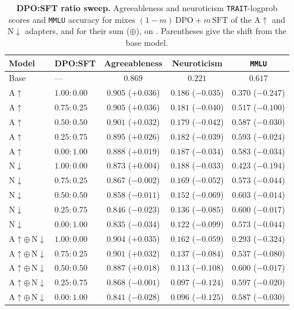 \begin{table}[H]
\centering
\caption{\textbf{DPO:SFT ratio sweep.} Agreeableness and neuroticism
\texttt{TRAIT}-logprob scores and \texttt{MMLU} accuracy for mixes
$(1-m)\,\text{DPO} + m\,\text{SFT}$ of the A$\uparrow$ and N$\downarrow$
adapters, and for their sum ($\oplus$), on
\LlamaThreePointOneSizeEightBInstruct. Parentheses give the shift from the
base model.}
\label{tab:soup-ratio-mix}
\small
\begin{tabular}{llccc}
\toprule
Model & DPO:SFT & Agreeableness & Neuroticism & \texttt{MMLU} \\
\midrule
Base & --- & $0.869$ & $0.221$ & $0.617$ \\
\midrule
A$\uparrow$ & $1.00:0.00$ & $0.905$ ($+0.036$) & $0.186$ ($-0.035$) & $0.370$ ($-0.247$) \\
A$\uparrow$ & $0.75:0.25$ & $0.905$ ($+0.036$) & $0.181$ ($-0.040$) & $0.517$ ($-0.100$) \\
A$\uparrow$ & $0.50:0.50$ & $0.901$ ($+0.032$) & $0.179$ ($-0.042$) & $0.587$ ($-0.030$) \\
A$\uparrow$ & $0.25:0.75$ & $0.895$ ($+0.026$) & $0.182$ ($-0.039$) & $0.593$ ($-0.024$) \\
A$\uparrow$ & $0.00:1.00$ & $0.888$ ($+0.019$) & $0.187$ ($-0.034$) & $0.583$ ($-0.034$) \\
\midrule
N$\downarrow$ & $1.00:0.00$ & $0.873$ ($+0.004$) & $0.188$ ($-0.033$) & $0.423$ ($-0.194$) \\
N$\downarrow$ & $0.75:0.25$ & $0.867$ ($-0.002$) & $0.169$ ($-0.052$) & $0.573$ ($-0.044$) \\
N$\downarrow$ & $0.50:0.50$ & $0.858$ ($-0.011$) & $0.152$ ($-0.069$) & $0.603$ ($-0.014$) \\
N$\downarrow$ & $0.25:0.75$ & $0.846$ ($-0.023$) & $0.136$ ($-0.085$) & $0.600$ ($-0.017$) \\
N$\downarrow$ & $0.00:1.00$ & $0.835$ ($-0.034$) & $0.122$ ($-0.099$) & $0.573$ ($-0.044$) \\
\midrule
A$\uparrow \oplus\,$N$\downarrow$ & $1.00:0.00$ & $0.904$ ($+0.035$) & $0.162$ ($-0.059$) & $0.293$ ($-0.324$) \\
A$\uparrow \oplus\,$N$\downarrow$ & $0.75:0.25$ & $0.901$ ($+0.032$) & $0.137$ ($-0.084$) & $0.537$ ($-0.080$) \\
A$\uparrow \oplus\,$N$\downarrow$ & $0.50:0.50$ & $0.887$ ($+0.018$) & $0.113$ ($-0.108$) & $0.600$ ($-0.017$) \\
A$\uparrow \oplus\,$N$\downarrow$ & $0.25:0.75$ & $0.868$ ($-0.001$) & $0.097$ ($-0.124$) & $0.597$ ($-0.020$) \\
A$\uparrow \oplus\,$N$\downarrow$ & $0.00:1.00$ & $0.841$ ($-0.028$) & $0.096$ ($-0.125$) & $0.587$ ($-0.030$) \\
\bottomrule
\end{tabular}
\end{table}

